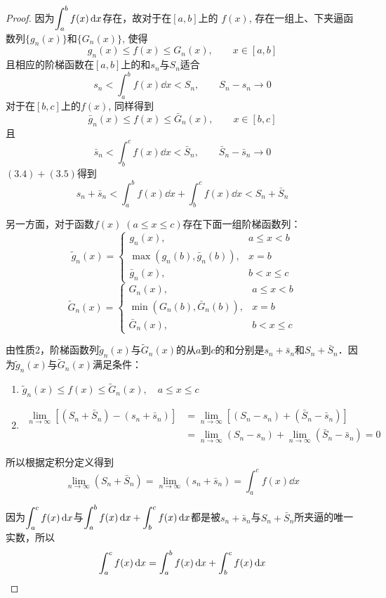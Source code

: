\begin{proof}
因为$\displaystyle\int^b_a f(x)\,{\rm d} x$存在，故对于在$[a,b]$上的
$f(x)$, 存在一组上、下夹逼函数列$\{g_n(x)\}$和$\{G_n(x)\}$, 使得
\[g_n (x) \le f (x) \le G_n (x),\qquad x\in [a,b]\]
且相应的阶梯函数在$[a,b]$上的和$s_n$与$S_n$适合
\begin{equation}
    s_n<\int^b_a f(x)\dd x<S_n,\qquad S_n-s_n\to 0
\end{equation}
对于在$[b,c]$上的$f(x)$, 同样得到
\[\bar g_n (x) \le f (x) \le \bar G_n (x),\qquad x\in [b,c]\]
且
\begin{equation}
    \bar  s_n<\int^c_b f(x)\dd x<\bar S_n,\qquad \bar S_n-\bar s_n\to 0
\end{equation}
$(3.4)+(3.5)$得到
\begin{equation}
    s_n+ \bar  s_n<\int^b_a f(x)\dd x+\int^c_b f(x)\dd x<S_n+\bar S_n
\end{equation}

另一方面，对于函数$f(x)\; (a\le x\le c)$存在下面一组阶梯函数列：
\[\tilde g_n(x)=\begin{cases}
    g_n(x),  &  a\le x<b\\
    \max\left(g_n(b), \bar g_n(b)\right),  &  x=b\\
    \bar g_n(x), & b<x\le c
\end{cases}\]
\[\tilde G_n(x)=\begin{cases}
    G_n(x),  &  a\le x<b\\
    \min\left(G_n(b), \bar G_n(b)\right),  &  x=b\\
    \bar G_n(x), & b<x\le c
\end{cases}\]

由性质2，阶梯函数列$\tilde g_n(x)$与$\tilde G_n(x)$的从$a$到$c$的和分别是$s_n+\bar s_n$和$S_n+\bar S_n$．因为$\tilde g_n(x)$与$\tilde G_n(x)$满足条件：
\begin{enumerate}
    \item $\tilde g_n(x)\le f(x)\le \tilde G_n(x),\quad a\le x\le c$
    \item 
    \begin{align*}
    \lim_{n\to\infty}\left[(S_n+\bar S_n)-(s_n+\bar s_n)\right]&=\lim_{n\to\infty}\left[(S_n-s_n)+(\bar S_n-\bar s_n)\right]\\
    &=\lim_{n\to\infty}(S_n-s_n)+\lim_{n\to\infty}(\bar S_n-\bar s_n)=0
    \end{align*}
\end{enumerate}
所以根据定积分定义得到
\[\lim_{n\to\infty}(S_n+\bar S_n)=\lim_{n\to\infty}(s_n+\bar s_n)=\int^c_a f(x)\dd x \]

因为$\displaystyle\int^c_a f(x)\,{\rm d} x $与$\displaystyle\int^b_a f(x)\,{\rm d} x +\displaystyle\int^c_b f(x)\,{\rm d} x $都是被$s_n+\bar s_n$与$S_n+\bar S_n$所夹逼的唯一实数，所以
\[\displaystyle\int^c_a f(x)\,{\rm d} x=\displaystyle\int^b_a f(x)\,{\rm d} x +\displaystyle\int^c_b f(x)\,{\rm d} x\]
\end{proof}

